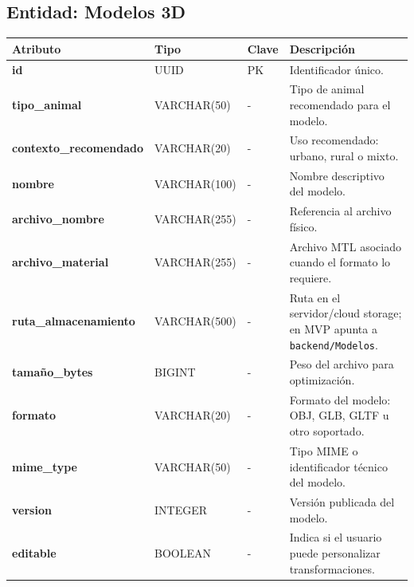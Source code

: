 \documentclass[12pt,a4paper]{article}
\begin{document}
\subsection{Entidad: Modelos 3D}
\begin{table}[htbp]
    \centering
    \begin{tabularx}{\textwidth}{>{\bfseries\color{PrimaryBlue}}l l l L}
        \toprule
         Atributo & Tipo & Clave & Descripción \\
        \midrule
        id & UUID & PK & Identificador único. \\
        tipo\_animal & VARCHAR(50) & - & Tipo de animal recomendado para el modelo. \\
        contexto\_recomendado & VARCHAR(20) & - & Uso recomendado: urbano, rural o mixto. \\
        nombre & VARCHAR(100) & - & Nombre descriptivo del modelo. \\
        archivo\_nombre & VARCHAR(255) & - & Referencia al archivo físico. \\
        archivo\_material & VARCHAR(255) & - & Archivo MTL asociado cuando el formato lo requiere. \\
        ruta\_almacenamiento & VARCHAR(500) & - & Ruta en el servidor/cloud storage; en MVP apunta a \texttt{backend/Modelos}. \\
        tamaño\_bytes & BIGINT & - & Peso del archivo para optimización. \\
        formato & VARCHAR(20) & - & Formato del modelo: OBJ, GLB, GLTF u otro soportado. \\
        mime\_type & VARCHAR(50) & - & Tipo MIME o identificador técnico del modelo. \\
        version & INTEGER & - & Versión publicada del modelo. \\
        editable & BOOLEAN & - & Indica si el usuario puede personalizar transformaciones. \\
        \bottomrule
    \end{tabularx}
\end{table}
\end{document}
